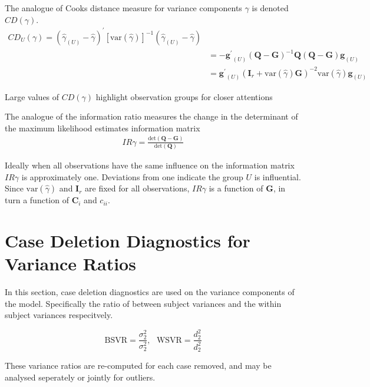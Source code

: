 \documentclass[12pt, a4paper]{report}
\theoremstyle{plain}
\theoremstyle{definition}
\theoremstyle{remark}
\begin{document}
	The analogue of Cooks distance measure for variance components $\gamma$ is denoted $CD(\gamma)$.
	\begin{eqnarray*}
		CD_{U}(\gamma) = (\hat{\gamma}_{(U)} - \hat{\gamma})^{\prime}[\mbox{var}(\hat{\gamma})]^{-1}(\hat{\gamma}_{(U)} - \hat{\gamma})\\
		&= -\boldsymbol{g^{\prime}}_{(U)} (\boldsymbol{Q}-\boldsymbol{G})^{-1}\boldsymbol{Q}(\boldsymbol{Q}-\boldsymbol{G})\boldsymbol{g}_{(U)} \\
		&= \boldsymbol{g^{\prime}}_{(U)} (\boldsymbol{I}_{r} + \mbox{var}(\hat{\gamma})\boldsymbol{G})^{-2}\mbox{var}(\hat{\gamma})\boldsymbol{g}_{(U)}
	\end{eqnarray*}
	
	Large values of $CD(\gamma)$ highlight observation groups for closer attentions
	
	The analogue of the information ratio measures the change in the determinant of the maximum likelihood estimates information matrix
	\begin{eqnarray*}
		IR{\gamma}  = \frac{\mbox{det}(\boldsymbol{Q} - \boldsymbol{G})}{\mbox{det}(\boldsymbol{Q})}
	\end{eqnarray*}
	
	Ideally when all observations have the same influence on the information matrix $IR{\gamma}$ is approximately one.
	Deviations from one indicate the group $U$ is influential. Since $\mbox{var}(\hat{\gamma})$ and $\boldsymbol{I}_{r}$ are fixed for all observations, $IR{\gamma}$ is a function of $\boldsymbol{G}$, in turn a function of $\boldsymbol{C}_{i}$ and $c_{ii}$.
	
	\section{Case Deletion Diagnostics for Variance Ratios}
	In this section, case deletion diagnostics are used on the variance components of the model. Specifically the ratio of between subject variances and the within subject variances respecitvely.
	
	
	\[ \mbox{BSVR} = \frac{\sigma^2_2}{\sigma^2_2} , \mbox{   } \mbox{WSVR} = \frac{d^2_2}{d^2_2} \]
	
	These variance ratios are re-computed for each case removed, and may be analysed seperately or jointly for outliers.
	
\end{document}
